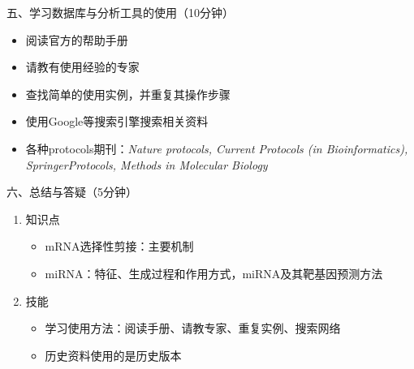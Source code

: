 \documentclass{TIJMUjiaoanLL}
\begin{document}
\vspace*{0.2cm}
\noindent
五、学习数据库与分析工具的使用（10分钟）
\begin{itemize}
  \item 阅读官方的帮助手册
  \item 请教有使用经验的专家
  \item 查找简单的使用实例，并重复其操作步骤
  \item 使用Google等搜索引擎搜索相关资料
  \item 各种protocols期刊：\textit{Nature protocols, Current Protocols (in Bioinformatics), SpringerProtocols, Methods in Molecular Biology}
\end{itemize}

\vspace*{0.2cm}
\noindent
六、总结与答疑（5分钟）
\begin{enumerate}
  \item 知识点
    \begin{itemize}
      \item mRNA选择性剪接：主要机制
      \item miRNA：特征、生成过程和作用方式，miRNA及其靶基因预测方法
    \end{itemize}
  \item 技能
    \begin{itemize}
      \item 学习使用方法：阅读手册、请教专家、重复实例、搜索网络
      \item 历史资料使用的是历史版本
    \end{itemize}
\end{enumerate}


\otherTail
\end{document}
